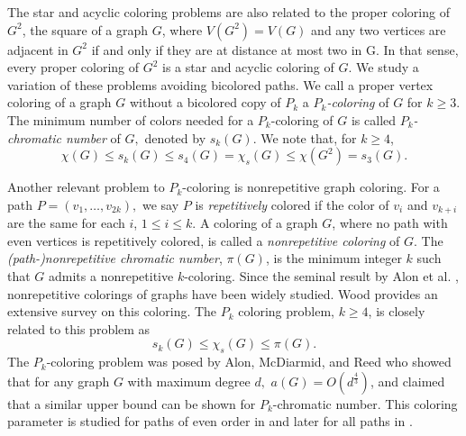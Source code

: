 \documentclass[
final, nomarks
]{dmtcs-episciences}
\begin{document}
The star and acyclic coloring problems are also related to the proper coloring of $G^2$, the square of a graph $G$, 
where $V(G^2)=V(G)$ and any two vertices are adjacent in $G^2$ 
 if and only if they are at distance at most two in G. 
In that sense, every proper coloring of $G^2$ is a star and acyclic coloring of $G.$ 
We study a variation of these problems avoiding bicolored paths. We call a proper vertex 
coloring of a graph $G$ without a bicolored copy of $P_k$ 
a {\it $P_k$-coloring} of $G$ for $k\geq 3$.  
The minimum number of colors needed for a $P_k$-coloring 
of $G$ is called {\it $P_k$-chromatic number} of $G,$ 
denoted by $s_k(G).$ We note that, for $k\geq 4$, 
\begin{displaymath}
\chi(G) \leq s_k(G) \leq s_4(G) = \chi_s(G)\leq \chi(G^2)=s_3(G).   
\end{displaymath}

Another relevant problem to $P_k$-coloring is nonrepetitive graph coloring. 
For a path $P=(v_1,\dots,v_{2k}),$ we say $P$ is {\it repetitively} colored if the color of $v_i$ and $v_{k+i}$ are the same for each $i$, $1\leq i\leq k.$ A coloring of a graph $G$, where no path with even vertices is repetitively colored, is called a {\it nonrepetitive coloring} of $G.$ The {\it (path-)nonrepetitive chromatic number}, $\pi(G)$, is the minimum
integer $k$ such that $G$ admits a nonrepetitive $k$-coloring.
Since the seminal result by Alon et al. \cite{alon2002nonrepetitive}, nonrepetitive colorings of graphs have been widely studied. Wood \cite{wood2021nonrepetitive} provides an extensive survey on this coloring. 
The $P_k$ coloring problem, $k\geq 4$, is closely related to this problem as  
\begin{displaymath}
s_k(G) \leq  \chi_s(G)\leq \pi(G).    
\end{displaymath}
The $P_k$-coloring problem was posed by Alon, McDiarmid, and Reed \cite{alon1991acyclic} who showed that for any graph $G$ with maximum degree $d,$ $a(G)= O(d^\frac{4}{3})$, and claimed  that a similar upper bound can be shown for $P_k$-chromatic number.  
This coloring parameter is studied for paths of even order in \cite{esperet2013acyclic} and 
later for all paths in \cite{hou2020coloring, kirticsouglu2024coloring}. 
\end{document}
